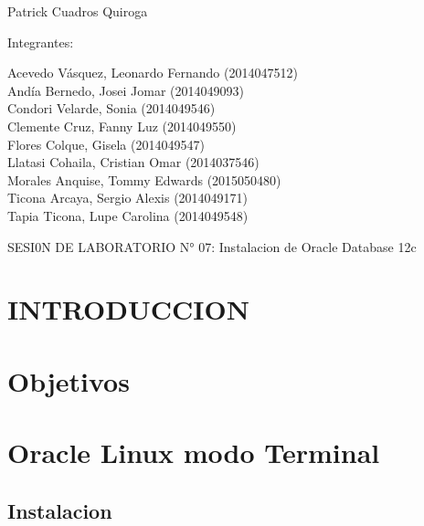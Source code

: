 \documentclass[12pt,letterpaper]{article}
\begin{document}
\begin{titlepage}
\begin{center}
\vspace*{0.1in}
\begin{large}
 Patrick Cuadros Quiroga\\
\end{large}

\vspace*{0.2in}
\vspace*{0.1in}
\begin{large}
Integrantes: \\
\begin{flushleft}
Acevedo Vásquez, Leonardo Fernando 	(2014047512) \\
Andía Bernedo, Josei Jomar 			(2014049093) \\
Condori Velarde, Sonia          	(2014049546) \\
Clemente Cruz, Fanny Luz    		(2014049550) \\
Flores Colque, Gisela           	(2014049547) \\
Llatasi Cohaila, Cristian Omar		(2014037546) \\
Morales Anquise, Tommy Edwards 		(2015050480) \\
Ticona Arcaya, Sergio Alexis		(2014049171) \\
Tapia Ticona, Lupe Carolina			(2014049548) \\
\end{flushleft}
\end{large}
\end{center}

\end{titlepage}




 \tableofcontents
 \newpage
SESI0N DE LABORATORIO N° 07:
Instalacion de Oracle Database 12c
 
\section{INTRODUCCION} 
 \newpage
\section{Objetivos} 
\newpage
\section{Oracle Linux modo Terminal}
\subsection{Instalacion}
\end{document}
